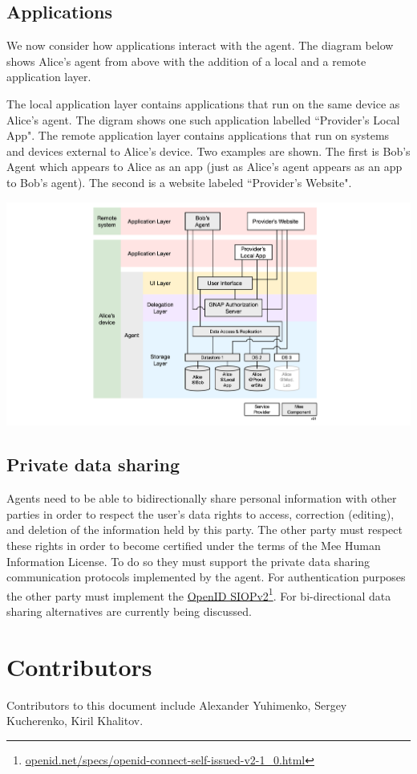 \documentclass[11pt, oneside]{article}   	%
\newcommand{\hyperfootnote}[1][]{\def\ArgI{{#1}}\hyperfootnoteRelay}
\newcommand\hyperfootnoteRelay[2][]{\href{#1#2}{\ArgI}\footnote{\href{#1#2}{#2}}}
\begin{document}
\subsection{Applications}

We now consider how applications interact with the agent. The diagram below shows Alice's agent from above with the addition of a local and a remote application layer. 

The local application layer contains applications that run on the same device as Alice's agent. The digram shows one such application labelled ``Provider's Local App". The remote application layer contains applications that run on systems and devices external to Alice's device. Two examples are shown. The first is Bob's Agent which appears to Alice as an app (just as Alice's agent appears as an app to Bob's agent). The second is a website labeled ``Provider's Website". 

\includegraphics[width=\textwidth]{./images/applications.png}

\subsection{Private data sharing}

Agents need to be able to bidirectionally share personal information with other parties in order to respect the user's data rights to access, correction (editing), and deletion of the information held by this party. The other party must respect these rights in order to become certified under the terms of the Mee Human Information License. To do so they must support the private data sharing communication protocols implemented by the agent. For authentication purposes the other party must implement the \hyperfootnote[OpenID SIOPv2][https://]{openid.net/specs/openid-connect-self-issued-v2-1\_0.html}. For bi-directional data sharing alternatives are currently being discussed.
    
\section{Contributors}
Contributors to this document include Alexander Yuhimenko, Sergey Kucherenko, Kiril Khalitov.   



\end{document}

